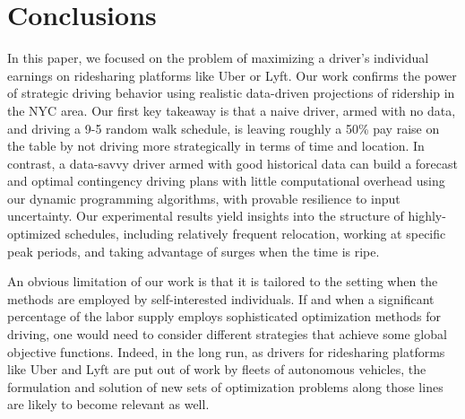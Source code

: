 
\section{Conclusions}
\label{sec:conclusions}
In this paper, we focused on the problem of 
maximizing a driver's individual earnings on ridesharing platforms like Uber or Lyft.
Our work confirms the power of strategic driving behavior %
using realistic data-driven projections
of ridership in the NYC area.  Our first key takeaway is that a naive driver,
armed with no data, and driving a 9-5 random walk schedule, is leaving 
roughly a 50\% pay raise on the table by not driving more strategically 
in terms of time and location.  In contrast, a data-savvy driver armed with
good historical data can build a forecast and optimal contingency driving plans 
with little computational overhead using 
our dynamic programming algorithms, with provable resilience to input
uncertainty.  Our experimental results yield insights into the
structure of highly-optimized schedules, including relatively frequent relocation,
working at specific peak periods, and taking advantage of 
surges when the time is ripe.  

An obvious limitation of our work is that it is tailored to the setting when the 
methods are employed by self-interested individuals.  If and when a 
significant percentage of the labor supply employs sophisticated optimization methods
for driving, one would need to consider different strategies that achieve some global objective functions. %
Indeed, in the long run, as drivers for ridesharing 
platforms like Uber and Lyft are put out of work by fleets of autonomous vehicles, 
the formulation and solution of new sets of optimization problems along those lines
are likely to become relevant as well.



